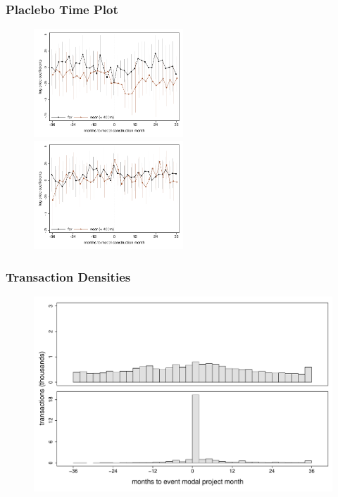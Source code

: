 \documentclass[aspectratio=149]{beamer}
\begin{document}

\begin{frame}
\frametitle{Placlebo Time Plot}
\begin{center}
\begin{figure}

\includegraphics[width=0.5\textwidth,trim={.77cm 0cm .21cm 0cm}]{timeplot.pdf}
   \hfill
\includegraphics[width=0.5\textwidth,trim={.77cm 0cm .21cm 0cm},clip]{timeplot_placebo.pdf}

\vspace{-3mm}
\end{figure}
\end{center}
\end{frame}


\begin{frame}
\frametitle{Transaction Densities}
\begin{center}
\begin{figure}
\includegraphics[scale=0.32]{summary_densitytime.pdf}
\vspace{-3mm}
\end{figure}
\end{center}
\end{frame}
\end{document}
